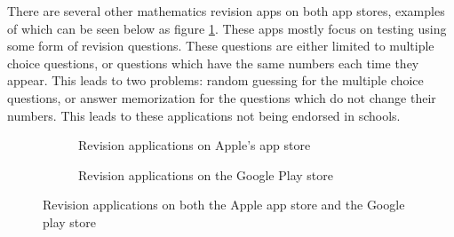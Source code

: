 \documentclass{article}
\begin{document}
There are several other mathematics revision apps on both app stores, examples of which can be seen below as figure \ref{figure:appStoreApps}. These apps mostly focus on testing using some form of revision questions. These questions are either limited to multiple choice questions, or questions which have the same numbers each time they appear. This leads to two problems: random guessing for the multiple choice questions, or answer memorization for the questions which do not change their numbers. This leads to these applications not being endorsed in schools. \par

\begin{figure}[H]
	\centering
	\begin{subfigure}{0.8\textwidth}
		\caption{Revision applications on Apple's app store}
	\end{subfigure}
	\hfill
	\begin{subfigure}{0.8\textwidth}
		\caption{Revision applications on the Google Play store}
	\end{subfigure}
	\caption{Revision applications on both the Apple app store and the Google play store}
	\label{figure:appStoreApps}
\end{figure}
\end{document}
